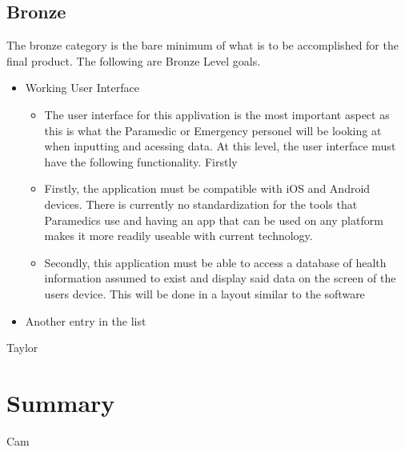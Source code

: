 \documentclass{article}
\begin{document}
\subsection{Bronze}
The bronze category is the bare minimum of what is to be accomplished for the final product. The following are Bronze Level goals.
\begin{itemize}
  \item Working User Interface
	\begin{itemize}
	\item The user interface for this applivation is the most important aspect as this is what the Paramedic or Emergency personel will be looking at when inputting and acessing data. At this level, the user interface must have the following functionality. Firstly
	\item Firstly, the application must be compatible with iOS and Android devices. There is currently no standardization for the tools that Paramedics use and having an app that can be used on any platform makes it more readily useable with current technology.
	\item Secondly, this application must be able to access a database of health information assumed to exist and display said data on the screen of the users device. This will be done in a layout similar to the software
	\end{itemize}
  \item Another entry in the list
\end{itemize}
Taylor
\section{Summary}
Cam
\end{document}
